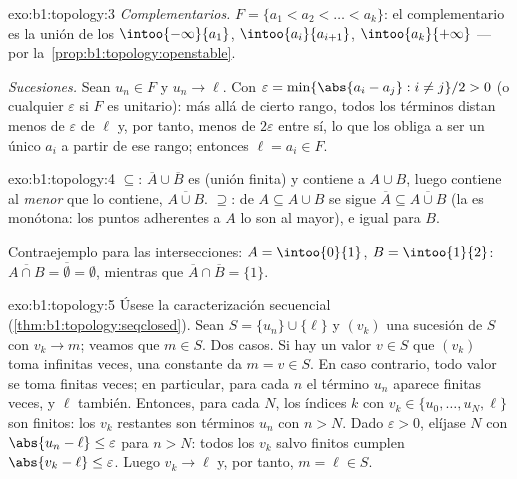 \begin{solution}{exo:b1:topology:3}
\emph{Complementarios.} $F = \{a_1 < a_2 < \dots < a_k\}$: el
complementario es la unión de los  
$\intoo{-\infty}{a_1}$, $\intoo{a_i}{a_{i+1}}$,
$\intoo{a_k}{+\infty}$ ---  por
la~\cref{prop:b1:topology:openstable}.

\emph{Sucesiones.} Sean $u_n \in F$ y $u_n \to \ell$. Con
$\varepsilon = \min\{\abs{a_i - a_j} : i \neq j\}/2 > 0$ (o cualquier
$\varepsilon$ si $F$ es unitario): más allá de cierto rango, todos los
términos distan menos de $\varepsilon$ de $\ell$ y, por tanto, menos
de $2\varepsilon$ entre sí, lo que los obliga a ser un único $a_i$ a
partir de ese rango; entonces $\ell = a_i \in F$.
\end{solution}

\begin{solution}{exo:b1:topology:4}
$\subseteq$: $\overline A \cup \overline B$ es  (unión finita)
y contiene a $A \cup B$, luego contiene al \emph{menor}  que
lo contiene, $\overline{A \cup B}$. $\supseteq$: de
$A \subseteq A \cup B$ se sigue $\overline A \subseteq
\overline{A \cup B}$ (la  es monótona: los puntos adherentes
a $A$ lo son al  mayor), e igual para $B$.

Contraejemplo para las intersecciones: $A = \intoo{0}{1}$,
$B = \intoo{1}{2}$: $\overline{A \cap B} = \overline\emptyset =
\emptyset$, mientras que $\overline A \cap \overline B = \{1\}$.
\end{solution}

\begin{solution}{exo:b1:topology:5}
Úsese la caracterización secuencial
(\cref{thm:b1:topology:seqclosed}). Sean $S = \{u_n\} \cup \{\ell\}$ y
$(v_k)$ una sucesión de $S$ con $v_k \to m$; veamos que $m \in S$. Dos
casos. Si hay un valor $v \in S$ que $(v_k)$ toma infinitas veces, una
 constante da $m = v \in S$. En caso contrario, todo
valor se toma finitas veces; en particular, para cada $n$ el término
$u_n$ aparece finitas veces, y $\ell$ también. Entonces, para cada
$N$, los índices $k$ con $v_k \in \{u_0, \dots, u_N, \ell\}$ son
finitos: los $v_k$ restantes son términos $u_n$ con $n > N$. Dado
$\varepsilon > 0$, elíjase $N$ con
$\abs{u_n - \ell} \leq \varepsilon$ para $n > N$: todos los $v_k$
salvo finitos cumplen $\abs{v_k - \ell} \leq \varepsilon$. Luego
$v_k \to \ell$ y, por tanto, $m = \ell \in S$.
\end{solution}


